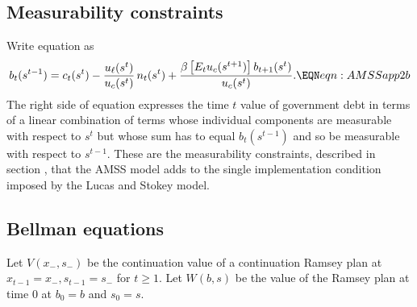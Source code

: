 \subsection{Measurability constraints}
Write equation  as
$$ b_t(s^{t-1})  = c_t(s^t) -  { \frac{u_{\ell}(s^t)}{u_{c}(s^t)}} \,n_t(s^t) + {\frac{\beta \left[E_t u_{c}(s^{t+1})\right] b_{t+1}(s^t)}{u_{c}(s^t)}} .
  \EQN eqn:AMSSapp2b $$
The right side of equation 
 expresses the time $t$ value of government debt in terms of a linear combination of terms whose individual components are
measurable with respect to $s^t$
but whose sum has to equal $b_t(s^{t-1})$ and so be measurable with respect to $s^{t-1}$.
These are the measurability constraints, described in
section ,   that the AMSS model
adds  to  the single implementation condition  imposed  by the Lucas and Stokey model.
%


\subsection{Bellman  equations}
Let $V(x_-, s_-)$ be the  continuation value of a continuation
Ramsey plan at $x_{t-1} = x_-, s_{t-1} =s_-$ for $t \geq 1$.
Let $W(b, s)$ be the value of the Ramsey plan at time $0$ at $b_0=b$ and $s_0 = s$.

